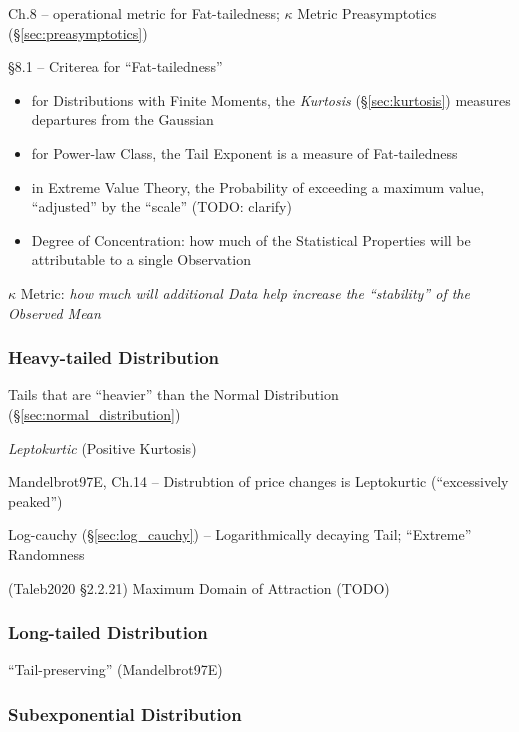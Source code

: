 Ch.8 -- operational metric for Fat-tailedness; $\kappa$ Metric \fist
Preasymptotics (\S\ref{sec:preasymptotics})

\S 8.1 -- Criterea for ``Fat-tailedness''

\begin{itemize}
  \item for Distributions with Finite Moments, the \emph{Kurtosis}
    (\S\ref{sec:kurtosis}) measures departures from the Gaussian
  \item for Power-law Class, the Tail Exponent is a measure of Fat-tailedness
  \item in Extreme Value Theory, the Probability of exceeding a maximum value,
    ``adjusted'' by the ``scale'' (TODO: clarify)
  \item Degree of Concentration: how much of the Statistical Properties will
    be attributable to a single Observation
\end{itemize}

$\kappa$ Metric: \emph{how much will additional Data help increase the
``stability'' of the Observed Mean}



\subsubsection{Heavy-tailed Distribution}\label{sec:heavy_tailed}

Tails that are ``heavier'' than the Normal Distribution
(\S\ref{sec:normal_distribution})

\emph{Leptokurtic} (Positive Kurtosis)

Mandelbrot97E, Ch.14 -- Distrubtion of price changes is Leptokurtic
(``excessively peaked'')

Log-cauchy (\S\ref{sec:log_cauchy}) -- Logarithmically decaying Tail;
``Extreme'' Randomness

(Taleb2020 \S 2.2.21) Maximum Domain of Attraction (TODO)



\subsubsection{Long-tailed Distribution}\label{sec:long_tailed}

``Tail-preserving'' (Mandelbrot97E)



\subsubsection{Subexponential Distribution}
\label{sec:subexponential_distribution}

